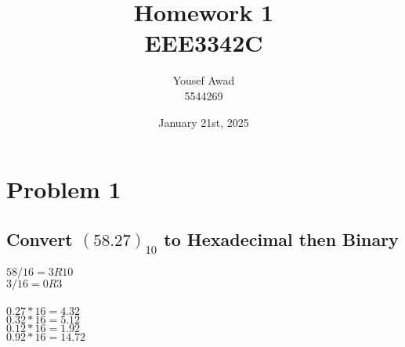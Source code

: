 \documentclass{article}
\title{Homework 1 \\ \large EEE3342C}
\author{Yousef Awad \\ \large 5544269}
\date{January 21st, 2025}
\begin{document}
\maketitle
\tableofcontents
\newpage

\section{Problem 1}
\subsection{Convert $(58.27)_{10}$ to Hexadecimal then Binary}
    \begin{center}
    $58/16 = 3 R 10$\\
    $3/16 = 0  R  3$\\
    \\
    $0.27 * 16 = 4.32$\\
    $0.32 * 16 = 5.12$\\
    $0.12 * 16 = 1.92$\\
    $0.92 * 16 = 14.72$\\
    \end{center}
\end{document}
